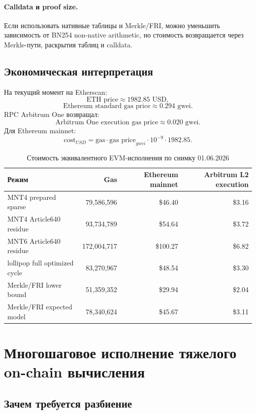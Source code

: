 \documentclass[12pt,a4paper]{article}
\newcommand{\Gas}{\mathrm{gas}}
\begin{document}
\paragraph{Calldata и proof size.}
Если использовать нативные таблицы и Merkle/FRI, можно уменьшить зависимость от
BN254 non-native arithmetic, но стоимость возвращается через Merkle-пути,
раскрытия таблиц и calldata.

\subsection{Экономическая интерпретация}

На текущий момент на Etherscan:
\[
    \text{ETH price}\approx1982.85\text{ USD},
\]
\[
    \text{Ethereum standard gas price}\approx0.294\text{ gwei}.
\]
RPC Arbitrum One возвращал:
\[
    \text{Arbitrum One execution gas price}\approx0.020\text{ gwei}.
\]
Для Ethereum mainnet:
\[
    \text{cost}_{USD}=
    \Gas\cdot \text{gas price}_{gwei}\cdot10^{-9}\cdot1982.85.
\]

\begin{table}[htbp]
\centering
\caption{Стоимость эквивалентного EVM-исполнения по снимку 01.06.2026}
\small
\begin{tabularx}{\linewidth}{Y r r r}
\toprule
Режим & Gas & Ethereum mainnet & Arbitrum L2 execution \\
\midrule
MNT4 prepared sparse & 79,586,596 & \$46.40 & \$3.16 \\
MNT4 Article640 residue & 93,734,789 & \$54.64 & \$3.72 \\
MNT6 Article640 residue & 172,004,717 & \$100.27 & \$6.82 \\
lollipop full optimized cycle & 83,270,967 & \$48.54 & \$3.30 \\
Merkle/FRI lower bound & 51,359,352 & \$29.94 & \$2.04 \\
Merkle/FRI expected model & 78,340,624 & \$45.67 & \$3.11 \\
\bottomrule
\end{tabularx}
\end{table}

\section{Многошаговое исполнение тяжелого on-chain вычисления}

\subsection{Зачем требуется разбиение}
\end{document}
